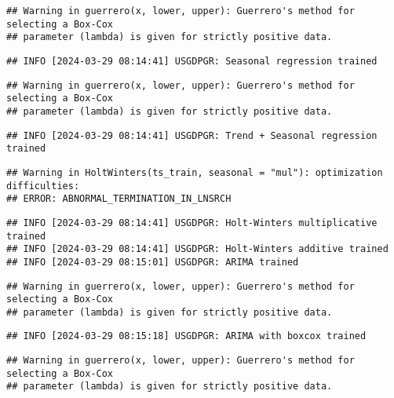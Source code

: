 \documentclass[
]{article}
\begin{document}
\begin{verbatim}
## Warning in guerrero(x, lower, upper): Guerrero's method for selecting a Box-Cox
## parameter (lambda) is given for strictly positive data.
\end{verbatim}

\begin{verbatim}
## INFO [2024-03-29 08:14:41] USGDPGR: Seasonal regression trained
\end{verbatim}

\begin{verbatim}
## Warning in guerrero(x, lower, upper): Guerrero's method for selecting a Box-Cox
## parameter (lambda) is given for strictly positive data.
\end{verbatim}

\begin{verbatim}
## INFO [2024-03-29 08:14:41] USGDPGR: Trend + Seasonal regression trained
\end{verbatim}

\begin{verbatim}
## Warning in HoltWinters(ts_train, seasonal = "mul"): optimization difficulties:
## ERROR: ABNORMAL_TERMINATION_IN_LNSRCH
\end{verbatim}

\begin{verbatim}
## INFO [2024-03-29 08:14:41] USGDPGR: Holt-Winters multiplicative trained
## INFO [2024-03-29 08:14:41] USGDPGR: Holt-Winters additive trained
## INFO [2024-03-29 08:15:01] USGDPGR: ARIMA trained
\end{verbatim}

\begin{verbatim}
## Warning in guerrero(x, lower, upper): Guerrero's method for selecting a Box-Cox
## parameter (lambda) is given for strictly positive data.
\end{verbatim}

\begin{verbatim}
## INFO [2024-03-29 08:15:18] USGDPGR: ARIMA with boxcox trained
\end{verbatim}

\begin{verbatim}
## Warning in guerrero(x, lower, upper): Guerrero's method for selecting a Box-Cox
## parameter (lambda) is given for strictly positive data.
\end{verbatim}
\end{document}
